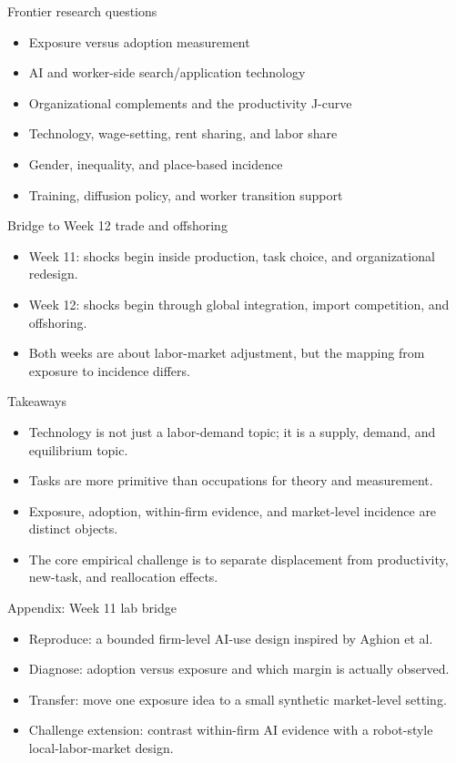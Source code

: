 \documentclass[aspectratio=169,11pt]{beamer}
\begin{document}
\begin{frame}{Frontier research questions}
\begin{itemize}
    \item Exposure versus adoption measurement
    \item AI and worker-side search/application technology
    \item Organizational complements and the productivity J-curve
    \item Technology, wage-setting, rent sharing, and labor share
    \item Gender, inequality, and place-based incidence
    \item Training, diffusion policy, and worker transition support
\end{itemize}
\end{frame}

\begin{frame}{Bridge to Week 12 trade and offshoring}
\begin{itemize}
    \item Week 11: shocks begin inside production, task choice, and organizational redesign.
    \item Week 12: shocks begin through global integration, import competition, and offshoring.
    \item Both weeks are about labor-market adjustment, but the mapping from exposure to incidence differs.
\end{itemize}
\end{frame}

\begin{frame}{Takeaways}
\begin{itemize}
    \item Technology is not just a labor-demand topic; it is a supply, demand, and equilibrium topic.
    \item Tasks are more primitive than occupations for theory and measurement.
    \item Exposure, adoption, within-firm evidence, and market-level incidence are distinct objects.
    \item The core empirical challenge is to separate displacement from productivity, new-task, and reallocation effects.
\end{itemize}
\end{frame}

\appendix

\begin{frame}{Appendix: Week 11 lab bridge}
\begin{itemize}
    \item Reproduce: a bounded firm-level AI-use design inspired by Aghion et al.
    \item Diagnose: adoption versus exposure and which margin is actually observed.
    \item Transfer: move one exposure idea to a small synthetic market-level setting.
    \item Challenge extension: contrast within-firm AI evidence with a robot-style local-labor-market design.
\end{itemize}
\end{frame}
\end{document}
